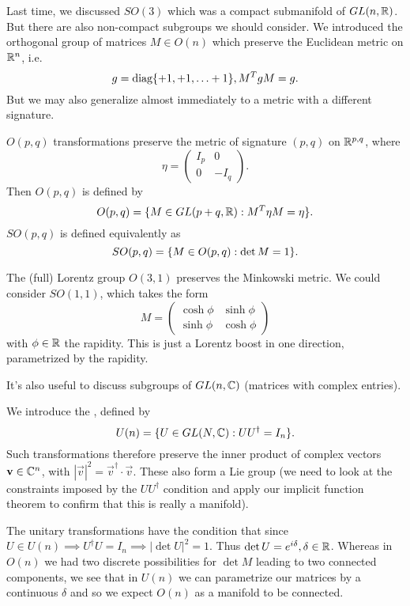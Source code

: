 Last time, we discussed $SO(3)$ which was a compact submanifold of $GL(n, \mathbb{R})$. But there are also non-compact subgroups we should consider. We introduced the orthogonal group of matrices $M\in O(n)$ which preserve the Euclidean metric on $\mathbb{R}^n$, i.e.
$$g=\text{diag}\{+1,+1,\ldots +1\}, M^T g M = g.$$
But we may also generalize almost immediately to a metric with a different signature.
\begin{defn}
$O(p,q)$ transformations preserve the metric of signature $(p,q)$ on $\mathbb{R}^{p,q}$, where
$$\eta=\begin{pmatrix}
I_p & 0\\
0 & -I_q
\end{pmatrix}.$$
Then $O(p,q)$ is defined by 
$$O(p,q)=\{M\in GL(p+q,\mathbb{R}) : M^T \eta M = \eta\}.$$
$SO(p,q)$ is defined equivalently as
$$SO(p,q)=\{M\in O(p,q) : \det M =1\}.$$
\end{defn}

\begin{exm}
The (full) Lorentz group $O(3,1)$ preserves the Minkowski metric. We could consider $SO(1,1)$, which takes the form
$$M=\begin{pmatrix}
\cosh \phi & \sinh \phi\\
\sinh\phi & \cosh \phi
\end{pmatrix}$$
with $\phi \in \mathbb{R}$ the rapidity. This is just a Lorentz boost in one direction, parametrized by the rapidity.
\end{exm}

It's also useful to discuss subgroups of $GL(n,\mathbb{C})$ (matrices with complex entries).
\begin{defn}
We introduce the , defined by
$$U(n)=\{ U \in GL(N, \mathbb{C}) : U U^\dagger = I_n\}.$$
Such transformations therefore preserve the inner product of complex vectors $\boldsymbol{\mathbf{v}}\in \mathbb{C}^n$, with $|\vec{v}|^2= \vec{v}^\dagger \cdot \vec{v}$.
These also form a Lie group (we need to look at the constraints imposed by the $UU^\dagger$ condition and apply our implicit function theorem to confirm that this is really a manifold).
\end{defn}

The unitary transformations have the condition that since $U\in U(n)\implies U^\dagger U = I_n \implies |\det U|^2 = 1$. Thus $\det U = e^{i\delta}, \delta \in \mathbb{R}$. Whereas in $O(n)$ we had two discrete possibilities for $\det M$ leading to two connected components, we see that in $U(n)$ we can parametrize our matrices by a continuous $\delta$ and so we expect $O(n)$ as a manifold to be connected.

